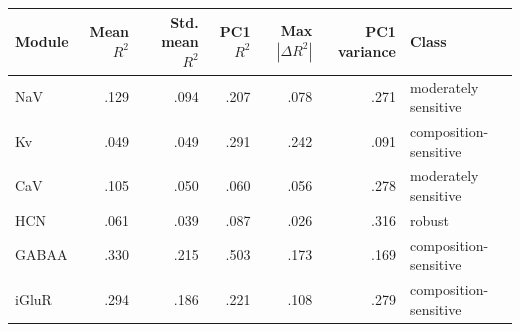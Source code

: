 \documentclass[11pt]{article}
\newcommand{\tablefont}{\fontsize{9.5}{11.2}\selectfont}
\newcommand{\sourcecaption}[1]{\Needspace{10\baselineskip}\vspace{2pt}{\small\bfseries #1}\par\vspace{2pt}}
\begin{document}
\sourcecaption{Target-definition sensitivity under the 24-feature reference specification (Table S33; XGBoost).}
\begin{center}\tablefont
\begin{tabular}{lrrrrrl}
\toprule
Module & Mean $R^2$ & Std. mean $R^2$ & PC1 $R^2$ & Max $|\Delta R^2|$ & PC1 variance & Class \\
\midrule
NaV & .129 & .094 & .207 & .078 & .271 & moderately sensitive \\
Kv & .049 & .049 & .291 & .242 & .091 & composition-sensitive \\
CaV & .105 & .050 & .060 & .056 & .278 & moderately sensitive \\
HCN & .061 & .039 & .087 & .026 & .316 & robust \\
GABAA & .330 & .215 & .503 & .173 & .169 & composition-sensitive \\
iGluR & .294 & .186 & .221 & .108 & .279 & composition-sensitive \\
\bottomrule
\end{tabular}
\end{center}
\end{document}
